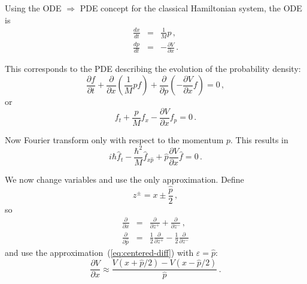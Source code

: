 \documentclass[prb,preprint]{revtex4-1}
\begin{document}
Using the ODE $\Rightarrow$ PDE concept for the classical Hamiltonian system, the ODE is
\begin{eqnarray}
\frac{dx}{dt} &=& \frac{1}{M}p \,, \\
\frac{dp}{dt} &=& -\frac{\partial V}{\partial x} \,.
\end{eqnarray}

This corresponds to the PDE describing the evolution of the probability density:
\begin{equation}
\frac{\partial f}{\partial t}
+ \frac{\partial}{\partial x}\left(\frac{1}{M}pf\right)
+ \frac{\partial}{\partial p}\left(-\frac{\partial V}{\partial x}f\right)
= 0 \,,
\end{equation}
or
\begin{equation}\label{eq:liouville-hamiltonian}
f_t + \frac{p}{M} f_x - \frac{\partial V}{\partial x} f_p = 0 \,.
\end{equation}

Now Fourier transform only with respect to the momentum $p$.  This results in
\begin{equation}\label{eq:fourier-liouville}
i\hbar \hat{f}_t - \frac{\hbar^2}{M} \hat{f}_{x\hat{p}} + \hat{p} \frac{\partial V}{\partial x} \hat{f} = 0 \,.
\end{equation}

We now change variables and use the only approximation.  Define
\begin{equation}
z^{\pm} = x \pm \frac{\hat{p}}{2} \,,
\end{equation}
so
\begin{eqnarray}
\frac{\partial}{\partial x} & = & \frac{\partial}{\partial z^+} + \frac{\partial}{\partial z^-}\,,\\
\frac{\partial}{\partial \hat{p}} &=& \frac{1}{2}\frac{\partial}{\partial z^+}
- \frac{1}{2}\frac{\partial}{\partial z^-}
\end{eqnarray}
and use the approximation~(\ref{eq:centered-diff}) with $\varepsilon = \hat{p}$:
\begin{equation}\label{eq:approx-V}
\frac{\partial V}{\partial x}
\approx \frac{V(x+\hat{p}/2) - V(x-\hat{p}/2)}{\hat{p}} \,.
\end{equation}
\end{document}
